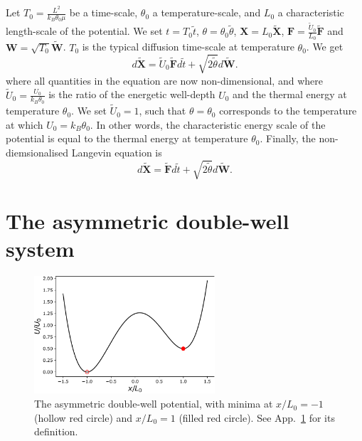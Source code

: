 \documentclass[]{cam-thesis}
\begin{document}
Let $T_{0}=\frac{L^{2}}{k_{B}\theta_{0}\mu}$ be a time-scale, $\theta_{0}$ a temperature-scale, and $L_0$ a characteristic length-scale of the potential. We set $t=T_{0}\tilde{t}$,
$\theta=\theta_{0}\tilde{\theta}$, $\mathbf{X}=L_0 \tilde{\mathbf{X}}$,
$\mathbf{F}= \frac{\tilde{U}_0}{L_0} \tilde{\mathbf{F}}$ and $\mathbf{W}=\sqrt{T_{0}}\tilde{\mathbf{W}}$. $T_{0}$ is the typical diffusion time-scale at temperature $\theta_{0}$. We get
\begin{equation}
	d\mathbf{\tilde{X}}=\tilde{U}_{0} \tilde{\mathbf{F}}d\tilde{t}+\sqrt{2\tilde{\theta}}d\tilde{\mathbf{W}}.
\end{equation}
where all quantities in the equation are now non-dimensional, and where $\tilde{U}_{0}=\frac{U_{0}}{k_{B}\theta_{0}}$ is the ratio
of the energetic well-depth $U_{0}$ and the thermal energy at temperature $\theta_{0}$. We set $\tilde{U}_0 = 1$, such that $\theta = \theta_0$ corresponds to the temperature at which $U_0 = k_B \theta_0$. In other words, the characteristic energy scale of the potential is equal to the thermal energy at temperature $\theta_0$. Finally, the non-diemsionalised Langevin equation is
\begin{equation}
	d\mathbf{\tilde{X}}= \tilde{\mathbf{F}}d\tilde{t}+\sqrt{2\tilde{\theta}}d\tilde{\mathbf{W}}.
\end{equation}

\section{The asymmetric double-well system} \label{app:The asymmetric double-well system}

\begin{figure}[t]
\includegraphics[width=0.6\textwidth]{figs_part1/mcmc/1D_process_potential}
\centering \caption{The asymmetric double-well potential, with minima at $x/L_0 = -1$ (hollow red circle) and $x/L_0=1$ (filled red circle). See App.~\ref{app:The asymmetric double-well system} for its definition.}
\label{fig:1D process potential} 
\end{figure}
\end{document}
